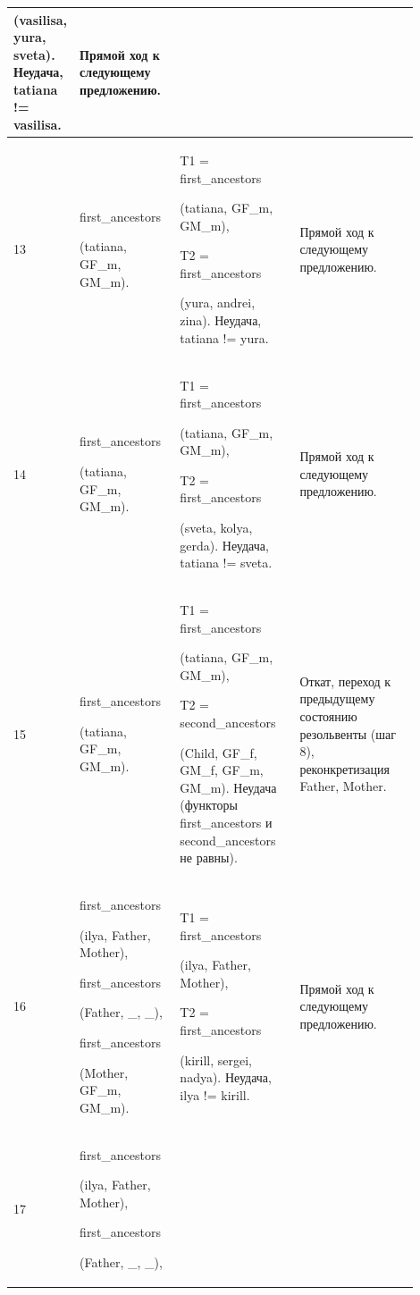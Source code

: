 \documentclass[a4paper,12pt]{article}
\begin{document}
\begin{center}
\begin{longtable}[h!]{|p{0.05\linewidth}|p{0.25\linewidth}|p{ 0.3\linewidth}|p{ 0.3\linewidth}|}
{				(vasilisa, yura, sveta). Неудача, tatiana != vasilisa.} & {Прямой ход к следующему предложению.}\\
			\hline
			{13} & {first\_ancestors
				
				(tatiana, GF\_m, GM\_m).} & {T1 = first\_ancestors
				
				(tatiana, GF\_m, GM\_m),
				
				T2 = first\_ancestors
				
				(yura, andrei, zina). Неудача, tatiana != yura.} & {Прямой ход к следующему предложению.}\\
			\hline
			{14} & {first\_ancestors
				
				(tatiana, GF\_m, GM\_m).} & {T1 = first\_ancestors
				
				(tatiana, GF\_m, GM\_m),
				
				T2 = first\_ancestors
				
				(sveta, kolya, gerda). Неудача, tatiana != sveta.} & {Прямой ход к следующему предложению.}\\
			\hline
			{15} & {first\_ancestors
				
				(tatiana, GF\_m, GM\_m).} & {T1 = first\_ancestors
				
				(tatiana, GF\_m, GM\_m),
				
				T2 = second\_ancestors
				
				(Child, GF\_f, GM\_f, GF\_m, GM\_m). Неудача (функторы first\_ancestors и second\_ancestors не равны).} & {Откат, переход к предыдущему состоянию резольвенты (шаг 8), реконкретизация Father, Mother.}\\
			\hline
			{16} & {first\_ancestors
				
				(ilya, Father, Mother),
				
				first\_ancestors
				
				(Father, \_, \_),
				
				first\_ancestors
				
				(Mother, GF\_m, GM\_m).} & {T1 = first\_ancestors
				
				(ilya, Father, Mother),
			
		T2 = first\_ancestors
	
(kirill, sergei, nadya). Неудача, ilya != kirill.} & {Прямой ход к следующему предложению.}\\
			\hline
			{17} & {first\_ancestors
				
				(ilya, Father, Mother),
				
				first\_ancestors
				
				(Father, \_, \_),
				
}
\end{longtable}
\end{center}
\end{document}
